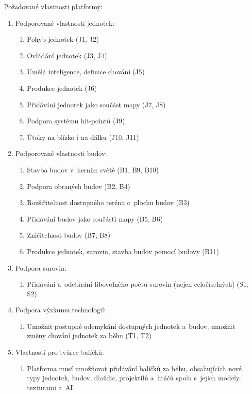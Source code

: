 Požadované vlastnosti platformy:
\begin{enumerate}
	\item Podporované vlastnosti jednotek:
		\begin{enumerate}
			\item Pohyb jednotek (J1, J2)
			\item Ovládání jednotek (J3, J4)
			\item Umělá inteligence, definice chování (J5)
			\item Produkce jednotek (J6)
			\item Přidávání jednotek jako součást mapy (J7, J8)
			\item Podpora systému hit-pointů (J9)
			\item Útoky na blízko i na dálku (J10, J11)
		\end{enumerate}
	\item Podporované vlastnosti budov:
		\begin{enumerate}
			\item Stavba budov v~herním světě (B1, B9, B10)
			\item Podpora obraných budov (B2, B4)
			\item Rozšiřitelnost dostupného terénu o~plochu budov (B3)
			\item Přidávání budov jako součásti mapy (B5, B6)
			\item Zničitelnost budov (B7, B8)
			\item Produkce jednotek, surovin, stavba budov pomocí budovy (B11)
		\end{enumerate}
	\item Podpora surovin:
		\begin{enumerate}
			\item Přidávání a~odebírání libovolného počtu surovin (nejen celočíselných) (S1, S2)
		\end{enumerate}
	\item Podpora výzkumu technologií:
		\begin{enumerate}
			\item Umožnit postupné odemykání dostupných jednotek a~budov, umožnit změny chování jednotek za běhu (T1, T2)
		\end{enumerate}
	\item Vlastnosti pro tvůrce balíčků:
		\begin{enumerate}
			\item Platforma musí umožňovat přidávání balíčků za běhu, obsahujících nové typy jednotek, budov,  dlaždic, projektilů a~hráčů spolu s~jejich modely, texturami a~AI.

\end{enumerate}
\end{enumerate}
